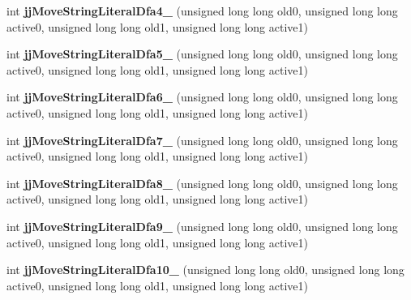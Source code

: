 \begin{DoxyCompactItemize}
int {\bfseries jj\+Move\+String\+Literal\+Dfa4\+\_} (unsigned long long old0, unsigned long long active0, unsigned long long old1, unsigned long long active1)
\item 
\mbox{\label{classvhdl_1_1parser_1_1_vhdl_parser_token_manager_aa1c9eb7b393a84921220d0136d748dbd}} 
int {\bfseries jj\+Move\+String\+Literal\+Dfa5\+\_} (unsigned long long old0, unsigned long long active0, unsigned long long old1, unsigned long long active1)
\item 
\mbox{\label{classvhdl_1_1parser_1_1_vhdl_parser_token_manager_ab641f1690033a6fc956f0d00f735d293}} 
int {\bfseries jj\+Move\+String\+Literal\+Dfa6\+\_} (unsigned long long old0, unsigned long long active0, unsigned long long old1, unsigned long long active1)
\item 
\mbox{\label{classvhdl_1_1parser_1_1_vhdl_parser_token_manager_ad83fff52a25eca007bfe403ccb636a27}} 
int {\bfseries jj\+Move\+String\+Literal\+Dfa7\+\_} (unsigned long long old0, unsigned long long active0, unsigned long long old1, unsigned long long active1)
\item 
\mbox{\label{classvhdl_1_1parser_1_1_vhdl_parser_token_manager_a5d95c7e8185ec845ecf6e93e98d196e2}} 
int {\bfseries jj\+Move\+String\+Literal\+Dfa8\+\_} (unsigned long long old0, unsigned long long active0, unsigned long long old1, unsigned long long active1)
\item 
\mbox{\label{classvhdl_1_1parser_1_1_vhdl_parser_token_manager_af64afd5c00603df4ea645484cd9bbc58}} 
int {\bfseries jj\+Move\+String\+Literal\+Dfa9\+\_} (unsigned long long old0, unsigned long long active0, unsigned long long old1, unsigned long long active1)
\item 
\mbox{\label{classvhdl_1_1parser_1_1_vhdl_parser_token_manager_acef807a99ab2dd2390d012ff64d22fb3}} 
int {\bfseries jj\+Move\+String\+Literal\+Dfa10\+\_} (unsigned long long old0, unsigned long long active0, unsigned long long old1, unsigned long long active1)
\item 

\end{DoxyCompactItemize}
